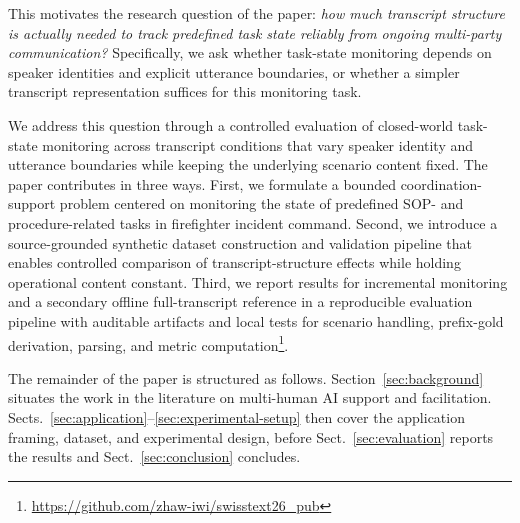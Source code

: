 This motivates the research question of the paper: \emph{how much transcript structure is actually needed to track predefined task state reliably from ongoing multi-party communication?} Specifically, we ask whether task-state monitoring depends on speaker identities and explicit utterance boundaries, or whether a simpler transcript representation suffices for this monitoring task.

We address this question through a controlled evaluation of closed-world task-state monitoring across transcript conditions that vary speaker identity and utterance boundaries while keeping the underlying scenario content fixed. The paper contributes in three ways. First, we formulate a bounded coordination-support problem centered on monitoring the state of predefined SOP- and procedure-related tasks in firefighter incident command. Second, we introduce a source-grounded synthetic dataset construction and validation pipeline that enables controlled comparison of transcript-structure effects while holding operational content constant. Third, we report results for incremental monitoring and a secondary offline full-transcript reference in a reproducible evaluation pipeline with auditable artifacts and local tests for scenario handling, prefix-gold derivation, parsing, and metric computation\footnote{\url{https://github.com/zhaw-iwi/swisstext26_pub}}.

The remainder of the paper is structured as follows. Section~\ref{sec:background} situates the work in the literature on multi-human AI support and facilitation. Sects.~\ref{sec:application}--\ref{sec:experimental-setup} then cover the application framing, dataset, and experimental design, before Sect.~\ref{sec:evaluation} reports the results and Sect.~\ref{sec:conclusion} concludes.
